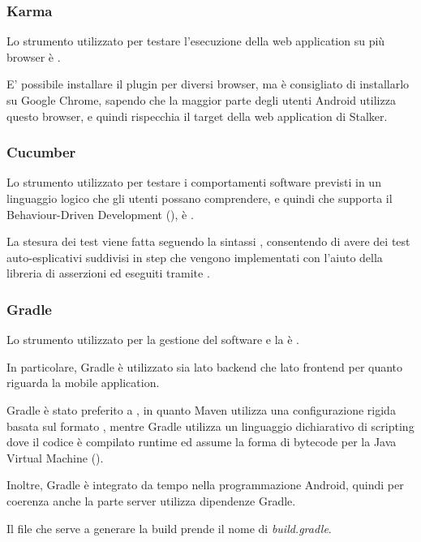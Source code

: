 \documentclass[../../../manuale-manutentore.tex]{subfiles}
\begin{document}

\subsubsection{Karma}%
\label{subs:karma}

Lo strumento utilizzato per testare l'esecuzione della web application su più browser è .

E' possibile installare il plugin per diversi browser, ma è consigliato di installarlo su Google Chrome, sapendo che la maggior parte degli utenti Android utilizza questo browser, e quindi rispecchia il target della web application di Stalker.

\subsubsection{Cucumber}%
\label{subs:cucumber}

Lo strumento utilizzato per testare i comportamenti software previsti in un linguaggio logico che gli utenti possano comprendere, e quindi che supporta il Behaviour-Driven Development (), è .

La stesura dei test viene fatta seguendo la sintassi , consentendo di avere dei test auto-esplicativi suddivisi in step che vengono implementati con l’aiuto della libreria di asserzioni  ed eseguiti tramite .

\subsubsection{Gradle}%
\label{subs:gradle}

Lo strumento utilizzato per la gestione del software e la  è .

In particolare, Gradle è utilizzato sia lato backend che lato frontend per quanto riguarda la mobile application.

Gradle è stato preferito a , in quanto Maven utilizza una configurazione rigida basata sul formato , mentre Gradle utilizza un linguaggio dichiarativo di scripting  dove il codice è compilato runtime ed assume la forma di bytecode per la Java Virtual Machine ().

Inoltre, Gradle è integrato da tempo nella programmazione Android, quindi per coerenza anche la parte server utilizza dipendenze Gradle.

Il file che serve a generare la build prende il nome di \textit{build.gradle}.
\end{document}
